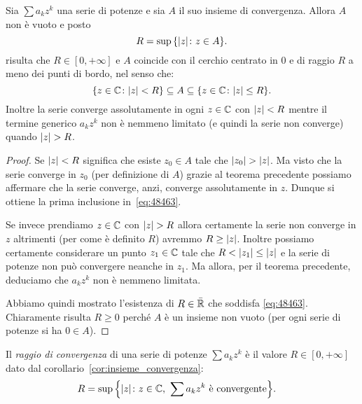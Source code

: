 \begin{corollary}%
\mymark{**}
\label{cor:insieme_convergenza}%
Sia $\sum a_k z^k$ una serie di potenze e sia $A$ il suo insieme di convergenza.
Allora $A$ non è vuoto e posto
\[
  R= \sup {\left\{ {\left|z\right|}\colon z\in A \right\}}.
\]
risulta che $R\in[0,+\infty]$ e $A$ coincide con il cerchio centrato in $0$
e di raggio $R$ a meno dei punti di bordo, nel senso che:
\begin{equation}\label{eq:48463}
   {\left\{ z\in {\mathbb C}\colon {\left|z\right|} < R \right\}}
   \subseteq A
   \subseteq {\left\{ z\in {\mathbb C}\colon {\left|z\right|}\le R \right\}}.
\end{equation}
Inoltre la serie converge assolutamente in ogni $z\in {\mathbb C}$ con ${\left|z\right|}<R$
mentre
il termine generico $a_k z^k$ non è nemmeno limitato (e quindi la serie non converge)
quando ${\left|z\right|}>R$.
\end{corollary}
%
\begin{proof}
Se ${\left|z\right|}<R$ significa che esiste $z_0\in A$ tale che ${\left|z_0\right|} > {\left|z\right|}$.
Ma visto che la serie converge in $z_0$ (per definizione di $A$) grazie al teorema
precedente possiamo affermare che la serie converge, anzi, converge assolutamente
in $z$. Dunque si ottiene la prima inclusione in~\eqref{eq:48463}.

Se invece prendiamo $z\in {\mathbb C}$ con ${\left|z\right|}>R$ allora
certamente la serie non converge in $z$ altrimenti (per come è definito $R$)
avremmo $R\ge {\left|z\right|}$.
Inoltre possiamo certamente considerare un punto $z_1\in{\mathbb C}$
tale che $R < {\left|z_1\right|} \le {\left|z\right|}$ e la serie
di potenze non può convergere neanche in $z_1$.
Ma allora, per il teorema precedente,
deduciamo che $a_k z^k$ non è nemmeno limitata.

Abbiamo quindi mostrato l'esistenza di $R\in \bar {{\mathbb R}}$ che soddisfa \eqref{eq:48463}.
Chiaramente risulta $R\ge 0$ perché $A$ è un insieme non vuoto
(per ogni serie di potenze si ha $0\in A$).
\end{proof}

\begin{definition}
\mymark{**}
Il \emph{raggio di convergenza}%
%
 di una serie di potenze $\sum a_k z^k$
è il valore $R\in[0,+\infty]$
dato dal corollario~\ref{cor:insieme_convergenza}:
\begin{align*}
  R &= \sup {\left\{ {\left|z\right|}\colon z\in {\mathbb C},\ \sum a_k z^k \text{ è convergente} \right\}}.
\end{align*}
\end{definition}

